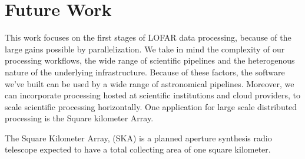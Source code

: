 \section{Future Work}

This work focuses on the first stages of LOFAR data processing, because of the large gains possible by parallelization. We take in mind the complexity of our processing workflows, the wide range of scientific pipelines and the heterogenous nature of the underlying infrastructure. Because of these factors, the software we've built can be used by a wide range of astronomical pipelines. Moreover, we can incorporate processing hosted at scientific institutions and cloud providers, to scale scientific processing horizontally.  One application for large scale distributed processing is the Square kilometer Array. 

The Square Kilometer Array, (SKA) is a planned aperture synthesis radio telescope expected to have a total collecting area of one square kilometer. 
